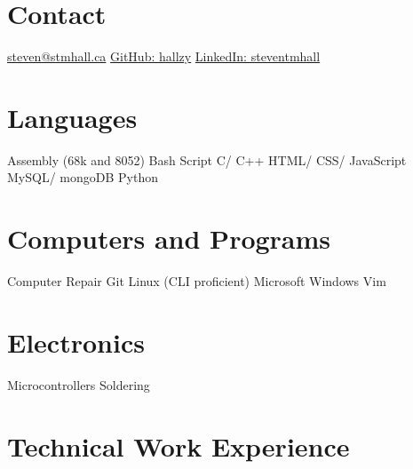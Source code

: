 \documentclass[]{friggeri-cv} %
\begin{document}


\begin{aside} %
\section{Contact}
\href{mailto:steven@stmhall.ca}{steven@stmhall.ca}
\href{http://github.com/hallzy}{GitHub: hallzy}
\href{https://www.linkedin.com/in/steventmhall}{LinkedIn: steventmhall}
\section{Languages}
Assembly (68k and 8052)
Bash Script
C/ C++
HTML/ CSS/ JavaScript
MySQL/ mongoDB
Python
\section{Computers and Programs}
Computer Repair
Git
Linux (CLI proficient)
Microsoft Windows
Vim
\section{Electronics}
Microcontrollers
Soldering
\end{aside}

\section{Technical Work Experience}
\end{document}

